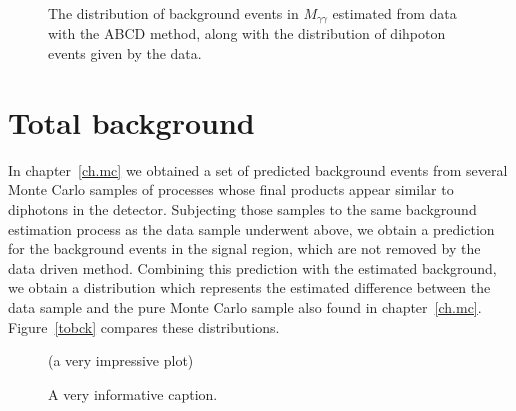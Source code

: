 \begin{figure}[htp]
\begin{minipage}[b]{.69\textwidth}
\begin{infilsf} \tiny 

\end{infilsf}
\end{minipage}\hfill\begin{minipage}[b]{.3\textwidth}
\caption{The distribution of background events in $M_{\gamma\gamma}$ estimated from data with the ABCD method, along with the distribution of dihpoton events given by the data.
\label{mggbck}}
\end{minipage}
\end{figure}

\section{Total background}
In chapter~\ref{ch.mc} we obtained a set of predicted background events from several Monte Carlo samples of processes whose final products appear similar to diphotons in the detector. Subjecting those samples to the same background estimation process as the data sample underwent above, we obtain a prediction for the background events in the signal region, which are not removed by the data driven method. Combining this prediction with the estimated background, we obtain a distribution which represents the estimated difference between the data sample and the pure Monte Carlo sample also found in chapter~\ref{ch.mc}. Figure~\ref{tobck} compares these distributions.

\begin{figure}[htp]
\begin{minipage}[b]{.69\textwidth}
\centering (a very impressive plot)
\end{minipage}\hfill\begin{minipage}[b]{.3\textwidth}
\caption{A very informative caption.
\label{etiso}}
\end{minipage}
\end{figure}




